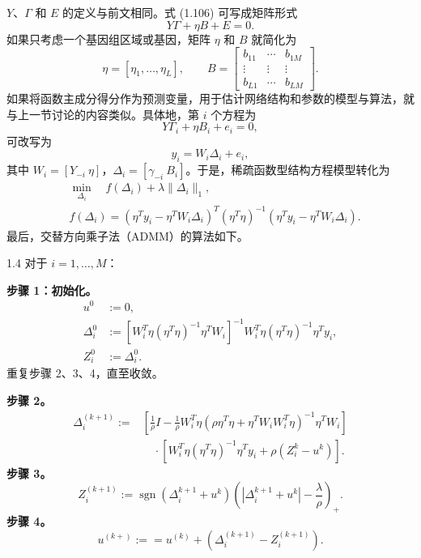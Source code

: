 $Y$、$\Gamma$ 和 $E$ 的定义与前文相同。式 (1.106) 可写成矩阵形式
\begin{equation}
Y\Gamma+\eta B+E=0.
\tag{1.107}
\end{equation}
如果只考虑一个基因组区域或基因，矩阵 $\eta$ 和 $B$ 就简化为
\[
\eta=[\eta_1,\ldots,\eta_L],
\qquad
B=\begin{bmatrix}
b_{11}&\cdots&b_{1M}\\
\vdots&\vdots&\vdots\\
b_{L1}&\cdots&b_{LM}
\end{bmatrix}.
\]
如果将函数主成分得分作为预测变量，用于估计网络结构和参数的模型与算法，就与上一节讨论的内容类似。具体地，第 $i$ 个方程为
\[
Y\Gamma_i+\eta B_i+e_i=0,
\]
可改写为
\begin{equation}
y_i=W_i\Delta_i+e_i,
\tag{1.108}
\end{equation}
其中 $W_i=[Y_{-i}\ \eta]$，$\Delta_i=[\gamma_{-i}\ B_i]$。于是，稀疏函数型结构方程模型转化为
\begin{equation}
\begin{aligned}
&\min_{\Delta_i}\quad f(\Delta_i)+\lambda\|\Delta_i\|_1,\\
&f(\Delta_i)=
(\eta^Ty_i-\eta^TW_i\Delta_i)^T
(\eta^T\eta)^{-1}
(\eta^Ty_i-\eta^TW_i\Delta_i).
\end{aligned}
\tag{1.109}
\end{equation}
最后，交替方向乘子法（ADMM）的算法如下。

\begin{bookalgorithm}{1.4}
对于 $i=1,\ldots,M$：

\textbf{步骤 1：初始化。}
\[
\begin{aligned}
u^0&:=0,\\
\Delta_i^0&:=
\left[W_i^T\eta(\eta^T\eta)^{-1}\eta^TW_i\right]^{-1}
W_i^T\eta(\eta^T\eta)^{-1}\eta^Ty_i,\\
Z_i^0&:=\Delta_i^0.
\end{aligned}
\]
重复步骤 2、3、4，直至收敛。

\textbf{步骤 2。}
\[
\begin{aligned}
\Delta_i^{(k+1)}:={}&
\left[\frac1\rho I-\frac1\rho W_i^T\eta
\left(\rho\eta^T\eta+\eta^TW_iW_i^T\eta\right)^{-1}
\eta^TW_i\right]\\
&\quad\cdot
\left[W_i^T\eta(\eta^T\eta)^{-1}\eta^Ty_i
 +\rho\left(Z_i^k-u^k\right)\right].
\end{aligned}
\]
\textbf{步骤 3。}
\[
Z_i^{(k+1)}:=
\operatorname{sgn}\left(\Delta_i^{k+1}+u^k\right)
\left(\left|\Delta_i^{k+1}+u^k\right|-\frac{\lambda}{\rho}\right)_+.
\]
\textbf{步骤 4。}
\[
u^{(k+)}:==u^{(k)}
 +\left(\Delta_i^{(k+1)}-Z_i^{(k+1)}\right).
\]
\end{bookalgorithm}

